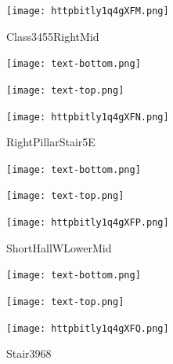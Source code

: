 \documentclass[letterpaper]{article}
\begin{document}
 \begingroup 
 \centerline{\texttt{[image: httpbitly1q4gXFM.png]}} 
 \endgroup 
 \vspace*{\fill} 

 \hfill{\small Class3455RightMid} 

  \vspace{0.7in} 
 
 \centerline{\texttt{[image: text-bottom.png]}} 
 
 \pagebreak 
{} 
 \vspace*{\fill} 
 
  \centerline{\texttt{[image: text-top.png]}} 
 
 \vspace{0.5in} 
 
 \begingroup 
 \centerline{\texttt{[image: httpbitly1q4gXFN.png]}} 
 \endgroup 
 \vspace*{\fill} 

 \hfill{\small RightPillarStair5E} 

  \vspace{0.7in} 
 
 \centerline{\texttt{[image: text-bottom.png]}} 
 
 \pagebreak 
{} 
 \vspace*{\fill} 
 
  \centerline{\texttt{[image: text-top.png]}} 
 
 \vspace{0.5in} 
 
 \begingroup 
 \centerline{\texttt{[image: httpbitly1q4gXFP.png]}} 
 \endgroup 
 \vspace*{\fill} 

 \hfill{\small ShortHallWLowerMid} 

  \vspace{0.7in} 
 
 \centerline{\texttt{[image: text-bottom.png]}} 
 
 \pagebreak 
{} 
 \vspace*{\fill} 
 
  \centerline{\texttt{[image: text-top.png]}} 
 
 \vspace{0.5in} 
 
 \begingroup 
 \centerline{\texttt{[image: httpbitly1q4gXFQ.png]}} 
 \endgroup 
 \vspace*{\fill} 

 \hfill{\small Stair3968} 

  \vspace{0.7in} 
 
\end{document}
